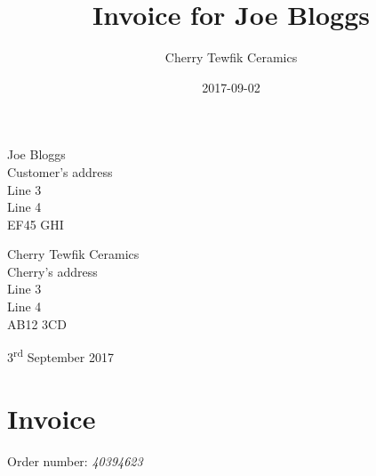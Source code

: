 \documentclass{article}
\title{Invoice for Joe Bloggs}
\date{2017-09-02}
\author{Cherry Tewfik Ceramics}
\begin{document}
	\begin{flushright}
		
	\end{flushright}
	\begin{multicols}{2}
		Joe Bloggs\\
		Customer's address\\
		Line 3\\
		Line 4\\
		EF45 GHI
		\vfill\null
		\columnbreak
		\begin{flushright}
			Cherry Tewfik Ceramics\\
			Cherry's address\\
			Line 3\\
			Line 4\\
			AB12 3CD
		\end{flushright}
	\end{multicols}
	\begin{multicols}{2}
		3\textsuperscript{rd} September 2017
		\section*{Invoice}
		\vfill\null
		\columnbreak
		\begin{flushright}
			Order number: \textit{40394623}
		\end{flushright}
	\end{multicols}
\end{document}
